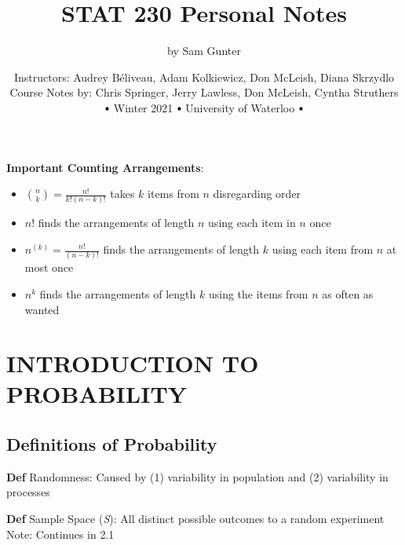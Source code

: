\documentclass[11pt,notitlepage]{report}
\newcommand\sbullet[1][.75]{\mathbin{\vcenter{\hbox{\scalebox{#1}{$\bullet$}}}}}
\begin{document}
\parindent=0pt


\title{\vspace{-15mm}STAT 230 Personal Notes \vspace{-5mm}}
\author{by Sam Gunter}

\date{Instructors: Audrey Béliveau, Adam Kolkiewicz, Don McLeish, Diana Skrzydlo\\ 
Course Notes by: Chris Springer, Jerry Lawless, Don McLeish, Cyntha Struthers\\
$\sbullet$ Winter 2021 $\sbullet$ University of Waterloo $\sbullet$}
\maketitle



\textbf{Important Counting Arrangements}:
\begin{itemize}
    \item $\binom{n}{k} = \frac{n!}{k!(n-k)!}$ takes $k$ items from $n$ disregarding order
    \item $n!$ finds the arrangements of length $n$ using each item in $n$ once
    \item $n^{(k)} = \frac{n!}{(n-k)!}$ finds the arrangements of length $k$ using each item from $n$ at most once
    \item $n^k$ finds the arrangements of length $k$ using the items from $n$ as often as wanted
\end{itemize}

\tableofcontents{}

\newpage
{} 
\setcounter{page}{1}

\chapter{INTRODUCTION TO PROBABILITY}

\section{Definitions of Probability}


\textbf{Def} Randomness: Caused by (1) variability in population and (2) variability in processes

\textbf{Def} Sample Space (\textit{S}): All distinct possible outcomes to a random experiment\\
\hspace*{5mm} Note: Continues in 2.1
\end{document}
